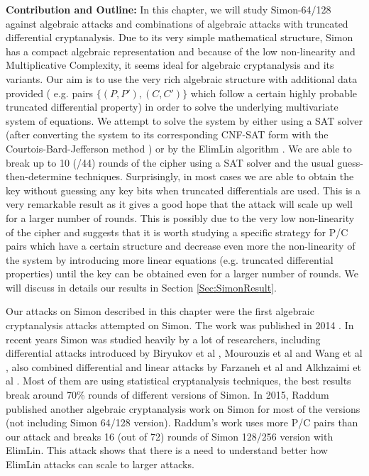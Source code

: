 \textbf{Contribution and Outline:} In this chapter, we will study Simon-64/128
against algebraic attacks and combinations of algebraic attacks with
truncated differential cryptanalysis. Due to its very simple mathematical structure,
Simon has a compact algebraic representation and because of the low non-linearity and
Multiplicative Complexity, it seems ideal for algebraic
cryptanalysis and its variants. Our aim is to use the very rich algebraic structure
with additional data provided ( e.g. pairs $\{(P,P'),(C,C')\}$ which
follow a certain highly probable truncated differential property) in order to solve
the underlying multivariate system of equations. We attempt to solve the system
by either using a SAT solver (after converting the system to its corresponding
CNF-SAT form with the Courtois-Bard-Jefferson method \cite{BardCourtoiJeffersonConv}) or by the ElimLin algorithm \cite{FourMNL,OptimiPaper,OptimiPaper2}.
We are able to break up to 10 (/44) rounds of the cipher using
a SAT solver and the usual guess-then-determine techniques.
Surprisingly, in most cases we are
able to obtain the key without guessing any key bits
when truncated differentials are used.
This is a very remarkable result as it gives a good hope that the attack will scale up well for a larger number of rounds. This is possibly due to the very low non-linearity of the cipher and suggests that it is worth studying a specific strategy for P/C pairs which have a certain structure and decrease even more the non-linearity of the system by introducing
more linear equations (e.g. truncated differential properties)
until the key can be obtained even for a larger number of rounds. We will discuss in details our results in Section \ref{Sec:SimonResult}.

Our attacks on Simon described in this chapter were the first algebraic cryptanalysis attacks attempted on Simon. The work was published in 2014 \cite{courtois2014combined}. In recent years Simon was studied heavily by a lot of researchers, including differential attacks introduced by Biryukov et al \cite{simon3}, Mourouzis et al \cite{SIMON6} and Wang et al \cite{SIMON4, SIMON5}, also combined differential and linear attacks by Farzaneh et al \cite{simon1} and Alkhzaimi et al \cite{simon2}. Most of them are using statistical cryptanalysis techniques, the best results break around 70\% rounds of different versions of Simon. In 2015, Raddum \cite{raddum2006new} published another algebraic cryptanalysis work on Simon for most of the versions (not including Simon 64/128 version). Raddum's work uses more P/C pairs than our attack and breaks 16 (out of 72) rounds of Simon 128/256 version with ElimLin.  This attack shows that there is a need to understand better how ElimLin attacks can scale to larger attacks. 


